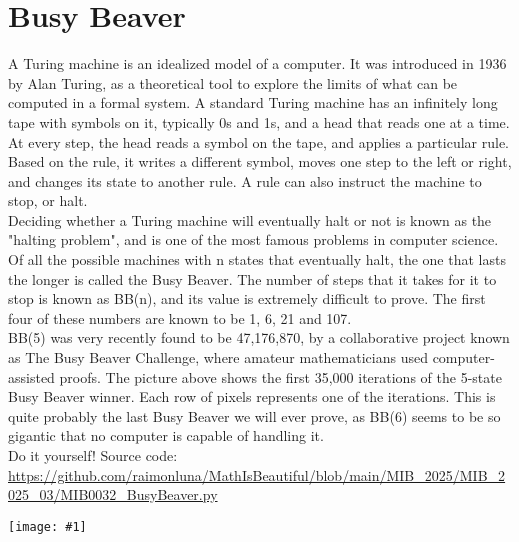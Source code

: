 \documentclass[12pt,landscape]{article}
\newcommand{\artpage}[3][]{%
  \begin{minipage}[t]{0.48\linewidth}
    \vspace{0pt} %
    \section*{#2} %
    \addcontentsline{toc}{section}{#2} %
    #3 %
  \end{minipage}%
  \hfill
  \begin{minipage}[t]{0.48\linewidth}
    \vspace{0pt} %
    \centering
    \texttt{[image: \#1]}
  \end{minipage}%
  \newpage
}
\begin{document}
\artpage[../Output/LowQuality/MIB0032_BusyBeaver.png]{Busy Beaver}{%
A Turing machine is an idealized model of a computer. It was introduced in 1936 by Alan Turing, as a theoretical tool to explore the limits of what can be computed in a formal system. A standard Turing machine has an infinitely long tape with symbols on it, typically 0s and 1s, and a head that reads one at a time. At every step, the head reads a symbol on the tape, and applies a particular rule. Based on the rule, it writes a different symbol, moves one step to the left or right, and changes its state to another rule. A rule can also instruct the machine to stop, or halt. \\

Deciding whether a Turing machine will eventually halt or not is known as the "halting problem", and is one of the most famous problems in computer science. Of all the possible machines with n states that eventually halt, the one that lasts the longer is called the Busy Beaver. The number of steps that it takes for it to stop is known as BB(n), and its value is extremely difficult to prove. The first four of these numbers are known to be 1, 6, 21 and 107.\\

BB(5) was very recently found to be 47,176,870, by a collaborative project known as The Busy Beaver Challenge, where amateur mathematicians used computer-assisted proofs. The picture above shows the first 35,000 iterations of the 5-state Busy Beaver winner. Each row of pixels represents one of the iterations. This is quite probably the last Busy Beaver we will ever prove, as BB(6) seems to be so gigantic that no computer is capable of handling it.\\

Do it yourself! Source code: \url{https://github.com/raimonluna/MathIsBeautiful/blob/main/MIB_2025/MIB_2025_03/MIB0032_BusyBeaver.py}
}
\end{document}

